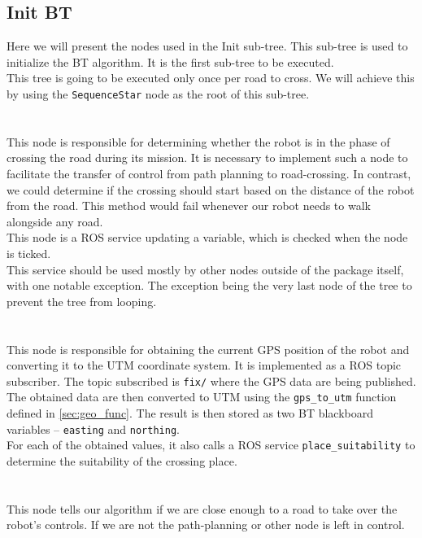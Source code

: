 \subsection{Init BT}
    Here we will present the nodes used in the Init sub-tree. This sub-tree is used to initialize the BT algorithm. It is the first sub-tree to be executed.\\
    This tree is going to be executed only once per road to cross. We will achieve this by using the \texttt{SequenceStar} node as the root of this sub-tree.\\\\
    \\
        This node is responsible for determining whether the robot is in the phase of crossing the road during its mission. It is necessary to implement such a node to facilitate the transfer of control from path planning to road-crossing. In contrast, we could determine if the crossing should start based on the distance of the robot from the road. This method would fail whenever our robot needs to walk alongside any road.\\
        This node is a ROS service updating a variable, which is checked when the node is ticked.\\
        This service should be used mostly by other nodes outside of the package itself, with one notable exception. The exception being the very last node of the tree to prevent the tree from looping.\\\\
    \\
        This node is responsible for obtaining the current GPS position of the robot and converting it to the UTM coordinate system. It is implemented as a ROS topic subscriber. The topic subscribed is \texttt{fix/} where the GPS data are being published.\\
        The obtained data are then converted to UTM using the \texttt{gps\_to\_utm} function defined in \ref{sec:geo_func}. The result is then stored as two BT blackboard variables -- \texttt{easting} and \texttt{northing}.\\
        For each of the obtained values, it also calls a ROS service \texttt{place\_suitability} to determine the suitability of the crossing place.\\\\
    \\
        This node tells our algorithm if we are close enough to a road to take over the robot's controls. If we are not the path-planning or other node is left in control.\\
